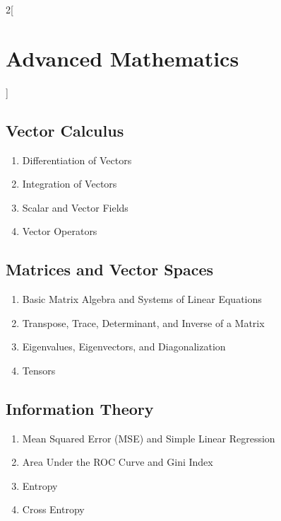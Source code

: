 \documentclass[8pt]{extarticle}
\begin{document}
\begin{multicols}{2}[
        \section{Advanced Mathematics}
    ]
\begin{tcbitemize}[ skin=sectionraster ]
    \end{tcbitemize}

    \subsection{Vector Calculus}
    \begin{enumerate}[label*=\arabic*.]
        \item Differentiation of Vectors
        \item Integration of Vectors
        \item Scalar and Vector Fields
        \item Vector Operators
    \end{enumerate}

    \subsection{Matrices and Vector Spaces}
    \begin{enumerate}[label*=\arabic*.]
        \item Basic Matrix Algebra and Systems of Linear Equations
        \item Transpose, Trace, Determinant, and Inverse of a Matrix
        \item Eigenvalues, Eigenvectors, and Diagonalization
        \item Tensors
    \end{enumerate}

    \subsection{Information Theory}
    \begin{enumerate}[label*=\arabic*.]
        \item Mean Squared Error (MSE) and Simple Linear Regression
        \item Area Under the ROC Curve and Gini Index
        \item Entropy
        \item Cross Entropy
    \end{enumerate}


\end{multicols}

\pagebreak
\end{document}
